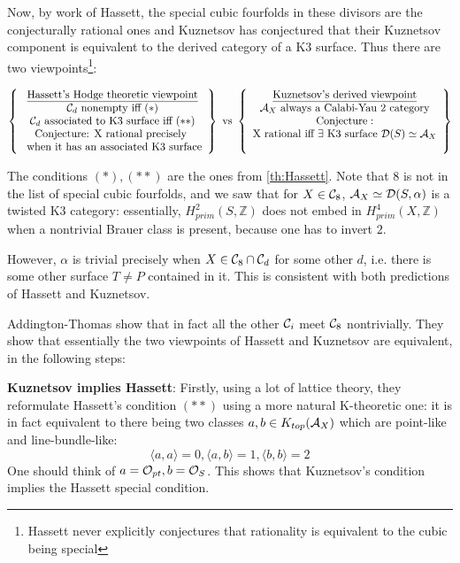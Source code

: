 Now, by work of Hassett, the special cubic fourfolds in these divisors are the conjecturally rational ones and Kuznetsov has conjectured that their Kuznetsov component is equivalent to the derived category of a K3 surface. Thus there are two viewpoints\footnote{Hassett never explicitly conjectures that rationality is equivalent to the cubic being special}: 

\[\left\{\begin{array}{cc}\underline{\text{Hassett's Hodge theoretic viewpoint}} \\
    \mathcal{C}_d \text{ nonempty iff } (*)\\
    \mathcal{C}_d \text{ associated to K3 surface iff } (**)\\
    \text{Conjecture: X rational precisely }\\\text{ when it has an associated K3 surface}
\end{array}\right\} \text{ vs } \left\{\begin{array}{cc}\underline{\text{Kuznetsov's derived viewpoint}} \\
    \mathcal{A}_X \text{ always a Calabi-Yau 2 category}\\
    \text{Conjecture}:\\
    \text{X rational iff } \exists \text{ K3 surface } \mathcal{D}(S)\simeq \mathcal{A}_X \\
    \\
\end{array}\right\} \]

The conditions $(*), (**)$ are the ones from \ref{th:Hassett}. Note that $8$ is not in the list of special cubic fourfolds, and we saw that for $X\in \mathcal{C}_8$, $\mathcal{A}_X\simeq \mathcal{D}(S,\alpha)$ is a twisted K3 category: essentially, $H^2_{prim}(S,\mathbb{Z})$ does not embed in $H^4_{prim}(X,\mathbb{Z})$ when a nontrivial Brauer class is present, because one has to invert $2$. 

However, $\alpha$ is trivial precisely when $X\in \mathcal{C}_8 \cap\mathcal{C}_d$ for some other $d$, i.e. there is some other surface $T\neq P$ contained in it. This is consistent with both predictions of Hassett and Kuznetsov.

Addington-Thomas show that in fact all the other $\mathcal{C}_i$ meet $\mathcal{C}_8$ nontrivially. They show that essentially the two viewpoints of Hassett and Kuznetsov are equivalent, in the following steps: 

\textbf{Kuznetsov implies Hassett}: Firstly, using a lot of lattice theory, they reformulate Hassett's condition $(**)$ using a more natural K-theoretic one: it is in fact equivalent to there being two classes $a,b\in K_{top}(\mathcal{A}_X)$ which are point-like and line-bundle-like: $$\langle a,a\rangle =0, \langle a, b \rangle =1, \langle b,b \rangle =2$$ One should think of $a=\mathcal{O}_{pt}, b=\mathcal{O}_S$. This shows that Kuznetsov's condition implies the Hassett special condition. 

